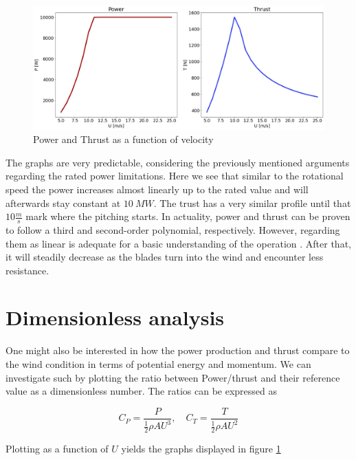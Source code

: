 \begin{figure}[H]
    \centering
    \includegraphics[scale=0.3]{Illustrations/powerthrust.png}
    \caption{Power and Thrust as a function of velocity}
    \label{fig:powerthrust}
\end{figure}

The graphs are very predictable, considering the previously mentioned arguments regarding the rated power limitations. Here we see that similar to the rotational speed the power increases almost linearly up to the rated value and will afterwards stay constant at $10 \: MW$. The trust has a very similar profile until that $10 \frac{m}{s}$ mark where the pitching starts. In actuality, power and thrust can be proven to follow a third and second-order polynomial, respectively. However, regarding them as linear is adequate for a basic understanding of the operation \cite{dimentionlesspower}. After that, it will steadily decrease as the blades turn into the wind and encounter less resistance. 

\section{Dimensionless analysis}

One might also be interested in how the power production and thrust compare to the wind condition in terms of potential energy and momentum. We can investigate such by plotting the ratio between Power/thrust and their reference value as a dimensionless number. The ratios can be expressed as

\begin{equation}
    C_P = \frac{P}{\frac{1}{2} \rho A U^3}, \quad C_T = \frac{T}{\frac{1}{2} \rho A U^2} 
\end{equation}

Plotting as a function of $U$ yields the graphs displayed in figure \ref{fig:powerthrust}

